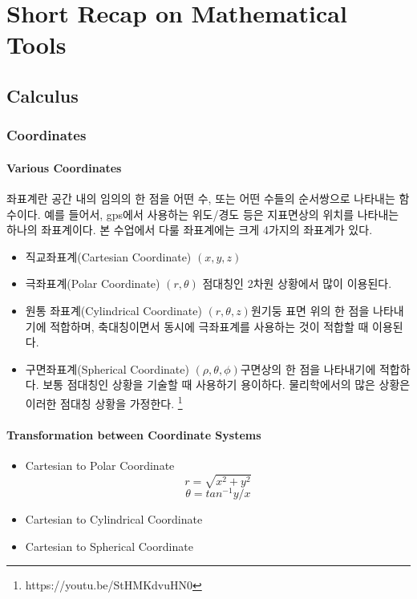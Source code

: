 \section{Short Recap on Mathematical Tools}

\subsection{Calculus}

\subsubsection{Coordinates}
\label{chap:coordinates}


\paragraph{Various Coordinates} 
좌표계란 공간 내의 임의의 한 점을 어떤 수, 또는 어떤 수들의 순서쌍으로 나타내는 함수이다. 예를 들어서, gps에서 사용하는 위도/경도 등은 지표면상의 위치를 나타내는 하나의 좌표계이다. 본 수업에서 다룰 좌표계에는 크게 4가지의 좌표계가 있다. 

\begin{itemize}
\item{직교좌표계(Cartesian Coordinate)} $(x,y,z)$
\item{극좌표계(Polar Coordinate)} $(r, \theta)$ 점대칭인 2차원 상황에서 많이 이용된다. 
\item{원통 좌표계(Cylindrical Coordinate)} $(r,\theta,z)$원기둥 표면 위의 한 점을 나타내기에 적합하며, 축대칭이면서 동시에 극좌표계를 사용하는 것이 적합할 때 이용된다. 
\item{구면좌표계(Spherical Coordinate)} $(\rho,\theta,\phi)$구면상의 한 점을 나타내기에 적합하다. 보통 점대칭인 상황을 기술할 때 사용하기 용이하다. 물리학에서의 많은 상황은 이러한 점대칭 상황을 가정한다. \footnote{https://youtu.be/StHMKdvuHN0}
\end{itemize}

\paragraph{Transformation between Coordinate Systems} 

\begin{itemize}
\item Cartesian to Polar Coordinate 
\begin{equation}
        r =  \sqrt{x^2+y^2} 
\end{equation}
\begin{equation}
        \theta = tan^{-1} y/x
\end{equation}
\item Cartesian to Cylindrical Coordinate
\item Cartesian to Spherical Coordinate
\end{itemize}



